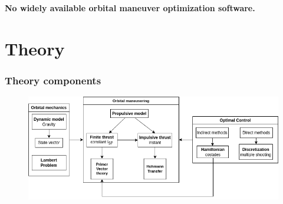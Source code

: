 \documentclass{beamer}
\begin{document}
\begin{frame}
    \textbf{No widely available orbital maneuver optimization software.}
\end{frame}

\section{Theory}

\begin{frame}
    \frametitle{Theory components}

    \begin{figure}[htbp]
        \centering
        \includegraphics[width=\textwidth]{img/theory_components.png}
    \end{figure}
\end{frame}
\end{document}
